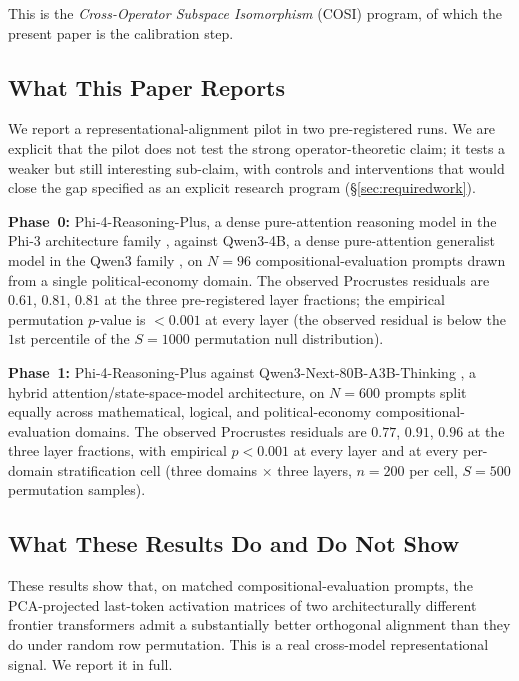 This is the \emph{Cross-Operator Subspace Isomorphism} (COSI) program,
of which the present paper is the calibration step.

\subsection*{What This Paper Reports}

We report a representational-alignment pilot in two pre-registered
runs. We are explicit that the pilot does not test the strong
operator-theoretic claim; it tests a weaker but still interesting
sub-claim, with controls and interventions that would close the gap
specified as an explicit research program (\S\ref{sec:requiredwork}).

\textbf{Phase~0:} Phi-4-Reasoning-Plus, a dense pure-attention
reasoning model in the Phi-3 architecture family \cite{abdin2024phi4},
against Qwen3-4B, a dense pure-attention generalist model in the Qwen3
family \cite{qwen2025qwen3}, on $N = 96$ compositional-evaluation
prompts drawn from a single political-economy domain. The observed
Procrustes residuals are $0.61$, $0.81$, $0.81$ at the three
pre-registered layer fractions; the empirical permutation $p$-value
is $< 0.001$ at every layer (the observed residual is below the
$1$st percentile of the $S = 1000$ permutation null distribution).

\textbf{Phase~1:} Phi-4-Reasoning-Plus against Qwen3-Next-80B-A3B-Thinking
\cite{qwen2025qwen3}, a hybrid attention/state-space-model architecture,
on $N = 600$ prompts split equally across mathematical, logical, and
political-economy compositional-evaluation domains. The observed
Procrustes residuals are $0.77$, $0.91$, $0.96$ at the three layer
fractions, with empirical $p < 0.001$ at every layer and at every
per-domain stratification cell (three domains $\times$ three layers,
$n = 200$ per cell, $S = 500$ permutation samples).

\subsection*{What These Results Do and Do Not Show}

These results show that, on matched compositional-evaluation prompts,
the PCA-projected last-token activation matrices of two architecturally
different frontier transformers admit a substantially better orthogonal
alignment than they do under random row permutation. This is a real
cross-model representational signal. We report it in full.

